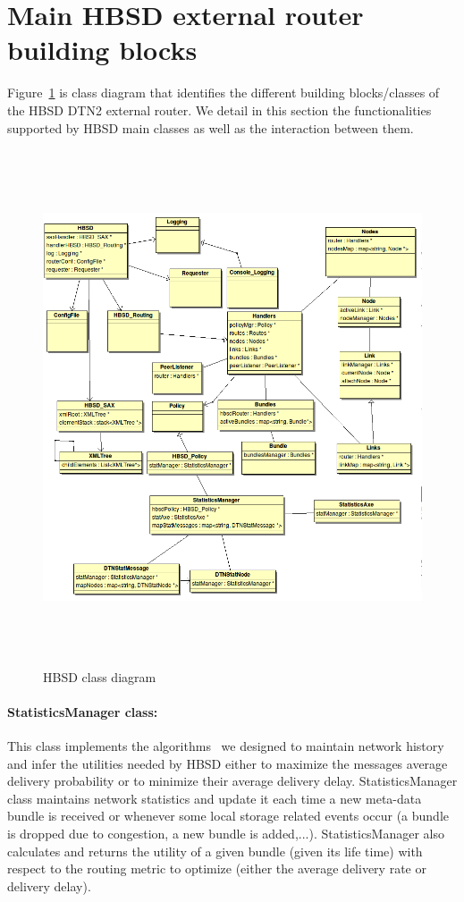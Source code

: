 \section{Main HBSD external router building blocks}

Figure~\ref{HBSD-CLASS} is class diagram that identifies the different building blocks/classes of the HBSD DTN2 external router. We detail in this section the functionalities supported by HBSD main classes as well as the interaction between them.

\begin{figure}[!h]
\centering
\includegraphics[width=6in,height=6in]{Chapitre4/HBSDClasses.png}
\caption{HBSD class diagram}
\label{HBSD-CLASS}
\end{figure}

\paragraph{StatisticsManager class:}

This class implements the algorithms~\cite{TMC:Report} we designed to maintain network history and infer the utilities needed by HBSD either to maximize the messages average delivery probability  or to minimize their average delivery delay.  
StatisticsManager class maintains network statistics and update it each time a new meta-data
bundle is received or whenever some local storage related events occur (a bundle is dropped due
to congestion, a new bundle is added,...).
StatisticsManager also calculates and returns the utility of a given bundle (given its life time)
with respect to the routing metric to optimize (either the average delivery rate or delivery
delay).

